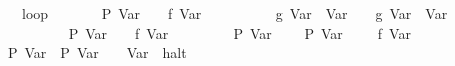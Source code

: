 \documentclass{llncs}
\begin{document}
\begin{isabellebody}
\ \ \ \ {}\ loop\isanewline
\ \ \ \ \ \ {}\ {}{}P\ {}Var\ {}{}{}{}\ {}\ {}{}\ f\ {}Var\ {}{}\isanewline
\ \ \ \ \ \ {}\ {}\ {}{}\ g\ {}Var\ {}{}\ {}Var\ {}{}{}\ {}\ {}{}\ g\ {}Var\ {}{}\ {}Var\ {}{}\isanewline
\ \ \ \ \ \ {}\isanewline
\ \ \ \ {}\ P\ {}Var\ {}{}{}\ {}\ {}{}\ f\ {}Var\ {}{}\isanewline
\ \ \ \ {}\isanewline
\ \ {}\ P\ {}Var\ {}{}\isanewline
\ \ {}\ {}{}{}P\ {}Var\ {}{}{}\ {}\ {}\ {}{}\ f\ {}Var\ {}{}{}\isanewline
\ \ {}\ P\ {}Var\ {}{}{}\ P\ {}Var\ {}{}{}\ {}\ {}{}\ Var\ {}{}\ halt\isanewline

\end{isabellebody}
\end{document}
